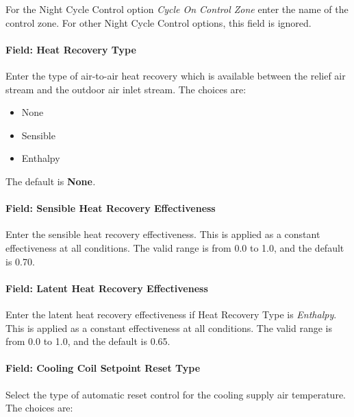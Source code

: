 For the Night Cycle Control option \emph{Cycle On Control Zone} enter the name of the control zone. For other Night Cycle Control options, this field is ignored.

\paragraph{Field: Heat Recovery Type}\label{field-heat-recovery-type-5}

Enter the type of air-to-air heat recovery which is available between the relief air stream and the outdoor air inlet stream. The choices are:

\begin{itemize}
\item
  None
\item
  Sensible
\item
  Enthalpy
\end{itemize}

The default is \textbf{None}\emph{.}

\paragraph{Field: Sensible Heat Recovery Effectiveness}\label{field-sensible-heat-recovery-effectiveness-5}

Enter the sensible heat recovery effectiveness. This is applied as a constant effectiveness at all conditions. The valid range is from 0.0 to 1.0, and the default is 0.70.

\paragraph{Field: Latent Heat Recovery Effectiveness}\label{field-latent-heat-recovery-effectiveness-5}

Enter the latent heat recovery effectiveness if Heat Recovery Type is \emph{Enthalpy}. This is applied as a constant effectiveness at all conditions. The valid range is from 0.0 to 1.0, and the default is 0.65.

\paragraph{Field: Cooling Coil Setpoint Reset Type}\label{field-cooling-coil-setpoint-reset-type-1}

Select the type of automatic reset control for the cooling supply air temperature. The choices are:

